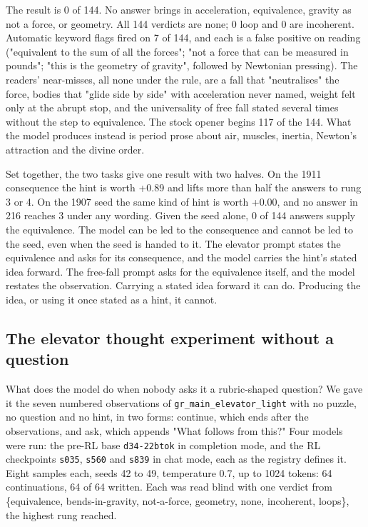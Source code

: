 \documentclass[reprint,prx,amsmath,amssymb,aps,superscriptaddress]{revtex4-2}
\begin{document}
The result is 0 of 144. No answer brings in acceleration, equivalence, gravity as not a force, or geometry. All 144 verdicts are none; 0 loop and 0 are incoherent. Automatic keyword flags fired on 7 of 144, and each is a false positive on reading ("equivalent to the sum of all the forces"; "not a force that can be measured in pounds"; "this is the geometry of gravity", followed by Newtonian pressing). The readers' near-misses, all none under the rule, are a fall that "neutralises" the force, bodies that "glide side by side" with acceleration never named, weight felt only at the abrupt stop, and the universality of free fall stated several times without the step to equivalence. The stock opener begins 117 of the 144. What the model produces instead is period prose about air, muscles, inertia, Newton's attraction and the divine order.

Set together, the two tasks give one result with two halves. On the 1911 consequence the hint is worth +0.89 and lifts more than half the answers to rung 3 or 4. On the 1907 seed the same kind of hint is worth +0.00, and no answer in 216 reaches 3 under any wording. Given the seed alone, 0 of 144 answers supply the equivalence. The model can be led to the consequence and cannot be led to the seed, even when the seed is handed to it. The elevator prompt states the equivalence and asks for its consequence, and the model carries the hint's stated idea forward. The free-fall prompt asks for the equivalence itself, and the model restates the observation. Carrying a stated idea forward it can do. Producing the idea, or using it once stated as a hint, it cannot.

\subsection{The elevator thought experiment without a question}

What does the model do when nobody asks it a rubric-shaped question? We gave it the seven numbered observations of \texttt{gr\_main\_elevator\_light} with no puzzle, no question and no hint, in two forms: continue, which ends after the observations, and ask, which appends "What follows from this?" Four models were run: the pre-RL base \texttt{d34-22btok} in completion mode, and the RL checkpoints \texttt{s035}, \texttt{s560} and \texttt{s839} in chat mode, each as the registry defines it. Eight samples each, seeds 42 to 49, temperature 0.7, up to 1024 tokens: 64 continuations, 64 of 64 written. Each was read blind with one verdict from \{equivalence, bends-in-gravity, not-a-force, geometry, none, incoherent, loops\}, the highest rung reached.
\end{document}
